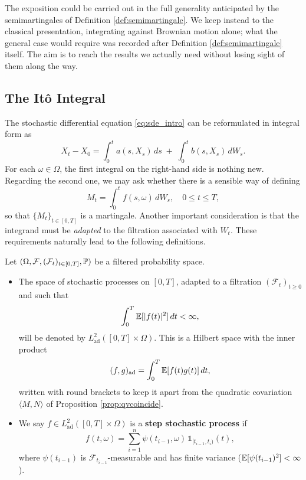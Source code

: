 The exposition could be carried out in the full generality anticipated by the semimartingales of Definition \ref{def:semimartingale}. We keep instead to the classical presentation, integrating against Brownian motion alone; what the general case would require was recorded after Definition \ref{def:semimartingale} itself. The aim is to reach the results we actually need without losing sight of them along the way.



\subsection{The Itô Integral}\label{subsec:itointegral}

The stochastic differential equation \eqref{eq:sde_intro} can be reformulated in integral form as
\begin{equation}\label{eq:sde_integral}
X_t - X_0 = \int_0^t a(s,X_s)\,ds \;+\; \int_0^t b(s,X_s)\,dW_s.
\end{equation}
For each $\omega \in \Omega$, the first integral on the right-hand side is nothing new. Regarding the second one, we may ask whether there is a sensible way of defining
\[
M_t = \int_0^t f(s,\omega)\,dW_s, \quad 0 \leq t \leq T,
\]
so that $\{M_t\}_{t\in[0,T]}$ is a martingale. Another important consideration is that the integrand must be \emph{adapted} to the filtration associated with $W_t$. These requirements naturally lead to the following definitions.

\begin{definition}\label{def:L2_adapted}
Let $(\Omega,\mathcal{F},(\mathcal{F}_t)_{t\in[0,T]},\mathbb{P})$ be a filtered probability space.
\begin{itemize}
    \item[i)] The space of stochastic processes on $[0,T]$, adapted to a filtration $(\mathcal{F}_t)_{t\geq 0}$ and such that 
    \[
    \int_0^T \mathbb{E}[|f(t)|^2]\,dt < \infty,
    \]
    will be denoted by $L^2_{\mathrm{ad}}([0,T]\times \Omega)$. This is a Hilbert space with the inner product
    \[
    (f,g)_{\mathrm{ad}} = \int_0^T \mathbb{E}[f(t)g(t)]\,dt ,
    \]
    written with round brackets to keep it apart from the quadratic covariation $\langle M,N\rangle$
    of Proposition \ref{prop:qvcoincide}.

    \item[ii)] We say $f \in L^2_{\mathrm{ad}}([0,T]\times \Omega)$ is a \textbf{step stochastic process} if
    \[
    f(t,\omega) = \sum_{i=1}^n \psi(t_{i-1},\omega)\,\mathds{1}_{[t_{i-1},t_i)}(t),
    \]
    where $\psi(t_{i-1})$ is $\mathcal{F}_{t_{i-1}}$-measurable and has finite variance ($\mathbb{E}[\psi(t_{i-1})^2] < \infty$).
\end{itemize}
\end{definition}

